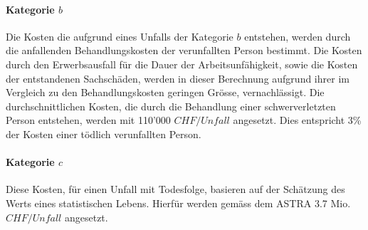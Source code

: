 \paragraph{Kategorie $b$} Die Kosten die aufgrund eines Unfalls der Kategorie $b$ entstehen, werden durch die anfallenden Behandlungskosten der verunfallten Person bestimmt. Die Kosten durch den Erwerbsausfall für die Dauer der Arbeitsunfähigkeit, sowie die Kosten der entstandenen Sachschäden, werden in dieser Berechnung aufgrund ihrer im Vergleich zu den Behandlungskosten geringen Grösse, vernachlässigt. Die durchschnittlichen Kosten, die durch die Behandlung einer schwerverletzten Person entstehen, werden mit 110'000 $CHF/Unfall$ angesetzt. Dies entspricht 3\% der Kosten einer tödlich verunfallten Person.

\paragraph{Kategorie $c$} Diese Kosten, für einen Unfall mit Todesfolge, basieren auf der Schätzung des Werts eines statistischen Lebens. Hierfür werden gemäss dem ASTRA 3.7 Mio. $CHF/Unfall$ angesetzt.



\newpage




%

